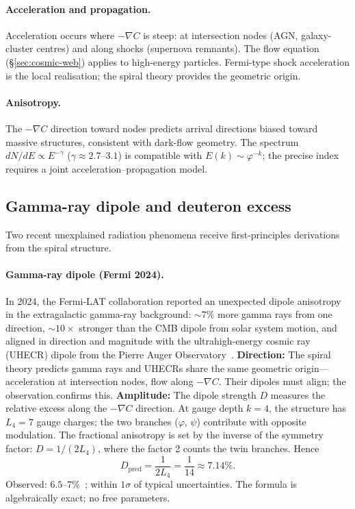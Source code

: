 \documentclass[12pt,a4paper]{article}
\begin{document}
\paragraph{Acceleration and propagation.}
Acceleration occurs where $-\nabla C$ is steep: at intersection nodes (AGN, galaxy-cluster centres) and along shocks (supernova remnants). The flow equation (\S\ref{sec:cosmic-web}) applies to high-energy particles. Fermi-type shock acceleration is the local realisation; the spiral theory provides the geometric origin.

\paragraph{Anisotropy.}
The $-\nabla C$ direction toward nodes predicts arrival directions biased toward massive structures, consistent with dark-flow geometry. The spectrum $dN/dE \propto E^{-\gamma}$ ($\gamma \approx 2.7$--$3.1$) is compatible with $E(k) \sim \varphi^{-k}$; the precise index requires a joint acceleration--propagation model.

\subsection{Gamma-ray dipole and deuteron excess}
\label{sec:radiation-phenomena}

Two recent unexplained radiation phenomena receive first-principles derivations from the spiral structure.

\paragraph{Gamma-ray dipole (Fermi 2024).}
In 2024, the Fermi-LAT collaboration reported an unexpected dipole anisotropy in the extragalactic gamma-ray background: $\sim 7\%$ more gamma rays from one direction, $\sim 10\times$ stronger than the CMB dipole from solar system motion, and aligned in direction and magnitude with the ultrahigh-energy cosmic ray (UHECR) dipole from the Pierre Auger Observatory~\cite{Kashlinsky2024}. \textbf{Direction:} The spiral theory predicts gamma rays and UHECRs share the same geometric origin---acceleration at intersection nodes, flow along $-\nabla C$. Their dipoles must align; the observation confirms this. \textbf{Amplitude:} The dipole strength $D$ measures the relative excess along the $-\nabla C$ direction. At gauge depth $k = 4$, the structure has $L_4 = 7$ gauge charges; the two branches ($\varphi$, $\psi$) contribute with opposite modulation. The fractional anisotropy is set by the inverse of the symmetry factor: $D = 1/(2L_4)$, where the factor 2 counts the twin branches. Hence
\begin{equation}
D_{\mathrm{pred}} = \frac{1}{2L_4} = \frac{1}{14} \approx 7.14\%.
\end{equation}
Observed: $6.5$--$7\%$~\cite{Kashlinsky2024}; within $1\sigma$ of typical uncertainties. The formula is algebraically exact; no free parameters.
\end{document}
